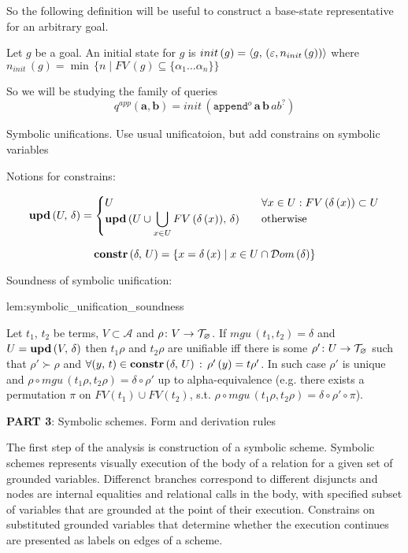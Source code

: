 So the following definition will be useful to construct a base-state representative for an arbitrary goal.

\begin{definition} Let $g$ be a goal. An initial state for $g$ is $init\,(g)=\langle g ,\, (\varepsilon, n_{init}\,(g)) \rangle $ where $ n_{init}\,(g) = \min\, \{ n \mid FV\,(g) \subseteq \{ \alpha_1\dots\alpha_n \} \} $
\end{definition}

So we will be studying the family of queries \[ q^{app}(\mathbf{a}, \mathbf{b}) = init\,(\texttt{append$^o$} \, \mathbf{a} \, \mathbf{b} \, ab^?) \]

\colorbox{blue!20}{\parbox{\textwidth}{Symbolic unifications. Use usual unificatoion, but add constrains on symbolic variables}}

Notions for constrains:

\[
\mbox{\textbf{upd}}\,(U,\, \delta) = \begin{cases}
                           U & \quad\forall x \in U : FV\,(\delta\,(x)) \subset U \\
                           \mbox{\textbf{upd}}\,(U \cup \displaystyle\bigcup\limits_{x \in U} FV\,(\delta\,(x)),\, \delta) & \quad\mbox{otherwise}
                          \end{cases}
\]

\[ \mbox{\textbf{constr}}\,(\delta,\, U) = \{ x = \delta\,(x) \mid x \in U \cap \mathcal{D}om\,(\delta) \} \]

Soundness of symbolic unification:

\begin{replemma}{lem:symbolic_unification_soundness}

  Let $t_1$, $t_2$ be terms,  $V \subset \mathcal{A}$ and $\rho \colon V \to \mathcal{T}_{\varnothing}$. If $mgu\,(t_1, t_2) = \delta$ and $U = \mbox{\textbf{upd}}\,(V,\, \delta) $  then $t_1 \rho$ and $t_2 \rho$ are unifiable iff there is some $\rho' \colon U \to \mathcal{T}_{\varnothing}$ such that $\rho' \succ \rho$ and $\forall (y, \, t) \in \mbox{\textbf{constr}}\,(\delta,\, U)\,:\, \rho'\,(y) = t \rho'$.
In such case $\rho'$ is unique and $ \rho \circ mgu\,(t_1 \rho, t_2 \rho) = \delta\circ\rho' $ up to alpha-equivalence (e.g. there exists a permutation $\pi$ on $FV(t_1) \cup FV(t_2)$, s.t. $ \rho \circ mgu\,(t_1 \rho, t_2 \rho) = \delta \circ\rho'\circ \pi$).
\end{replemma}


\colorbox{blue!20}{\parbox{\textwidth}{\textbf{PART 3}: Symbolic schemes. Form and derivation rules}}

The first step of the analysis is construction of a symbolic scheme. Symbolic schemes represents visually execution of the body of a relation for a given set of grounded variables. Differenct branches correspond to different disjuncts and nodes are internal equalities and relational calls in the body, with specified subset of variables that are grounded at the point of their execution. Constrains on substituted grounded variables that determine whether the execution continues are presented as labels on edges of a scheme.

